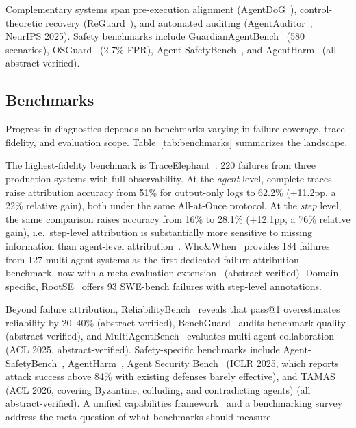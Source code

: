 Complementary systems span pre-execution alignment (AgentDoG~\cite{agentdog2026}), control-theoretic recovery (ReGuard~\cite{pandya2025}), and automated auditing (AgentAuditor~\cite{agentauditor2025}, NeurIPS 2025). Safety benchmarks include GuardianAgentBench~\cite{guardianagentbench2026} (580 scenarios), OSGuard~\cite{osguard2026} (2.7\% FPR), Agent-SafetyBench~\cite{agentsafetybench2024}, and AgentHarm~\cite{agentharm2024} (all abstract-verified).

\subsection{Benchmarks}\label{sec:diag_bench}

Progress in diagnostics depends on benchmarks varying in failure coverage, trace fidelity, and evaluation scope. Table~\ref{tab:benchmarks} summarizes the landscape.

The highest-fidelity benchmark is TraceElephant~\cite{traceelephant2026}: 220 failures from three production systems with full observability. At the \emph{agent} level, complete traces raise attribution accuracy from 51\% for output-only logs to 62.2\% (+11.2pp, a 22\% relative gain), both under the same All-at-Once protocol. At the \emph{step} level, the same comparison raises accuracy from 16\% to 28.1\% (+12.1pp, a 76\% relative gain), i.e.\ step-level attribution is substantially more sensitive to missing information than agent-level attribution~\cite{traceelephant2026}. Who\&When~\cite{whenwhen2025} provides 184 failures from 127 multi-agent systems as the first dedicated failure attribution benchmark, now with a meta-evaluation extension~\cite{whwhpro2026} (abstract-verified). Domain-specific, RootSE~\cite{trajaudit2026} offers 93 SWE-bench failures with step-level annotations.

Beyond failure attribution, ReliabilityBench~\cite{reliabilitybench2026} reveals that pass@1 overestimates reliability by 20--40\% (abstract-verified), BenchGuard~\cite{benchguard2026} audits benchmark quality (abstract-verified), and MultiAgentBench~\cite{multiagentbench2025} evaluates multi-agent collaboration (ACL 2025, abstract-verified). Safety-specific benchmarks include Agent-SafetyBench~\cite{agentsafetybench2024}, AgentHarm~\cite{agentharm2024}, Agent Security Bench~\cite{asb2025} (ICLR 2025, which reports attack success above 84\% with existing defenses barely effective), and TAMAS~\cite{tamas2026} (ACL 2026, covering Byzantine, colluding, and contradicting agents) (all abstract-verified). A unified capabilities framework~\cite{unifiedcapab2026} and a benchmarking survey~\cite{evalbenchmark2025} address the meta-question of what benchmarks should measure.

